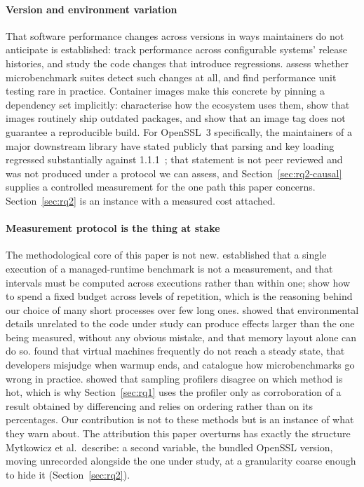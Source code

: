 \documentclass[preprint,12pt,authoryear]{elsarticle}
\begin{document}
\paragraph{Version and environment variation} That software performance
changes across versions in ways maintainers do not anticipate is established:
\citet{kaltenecker2023performance} track performance across
configurable systems' release histories, and \citet{chen2017exploratory} study the code changes that introduce
regressions. \citet{laaber2018evaluation} assess whether
microbenchmark suites detect such changes at all, and \citet{stefan2017unit} find performance unit testing rare in practice.
Container images make this concrete by pinning a dependency set implicitly:
\citet{cito2017empirical} characterise how the ecosystem uses them,
\citet{zerouali2019outdated} show that images routinely ship
outdated packages, and \citet{malka2026docker} show that an image
tag does not guarantee a reproducible build. For OpenSSL~3 specifically, the
maintainers of a major downstream library have stated publicly that parsing and
key loading regressed substantially against 1.1.1~\citep{pyca2026stateofopenssl};
that statement is not peer reviewed and was not produced under a protocol we
can assess, and Section~\ref{sec:rq2-causal} supplies a controlled measurement
for the one path this paper concerns. Section~\ref{sec:rq2} is an instance with
a measured cost attached.

\paragraph{Measurement protocol is the thing at stake} The methodological core
of this paper is not new. \citet{georges2007statistically}
established that a single execution of a managed-runtime benchmark is not a
measurement, and that intervals must be computed across executions rather than
within one; \citet{kalibera2013rigorous} show how to spend a
fixed budget across levels of repetition, which is the reasoning behind our
choice of many short processes over few long ones. \citet{mytkowicz2009wrong} showed that environmental details unrelated to
the code under study can produce effects larger than the one being measured,
without any obvious mistake, and \citet{curtsinger2013stabilizer} that memory layout alone can do so.
\citet{barrett2017warmup} found that virtual machines frequently
do not reach a steady state, \citet{traini2023steady} that
developers misjudge when warmup ends, and \citet{costa2021wrong}
catalogue how microbenchmarks go wrong in practice. \citet{mytkowicz2010profilers} showed that sampling profilers disagree on
which method is hot, which is why Section~\ref{sec:rq1} uses the profiler only
as corroboration of a result obtained by differencing and relies on ordering
rather than on its percentages. Our contribution is not to these methods but is
an instance of what they warn about. The attribution this paper overturns has
exactly the structure Mytkowicz et al.\ describe: a second variable, the
bundled OpenSSL version, moving unrecorded alongside the one under study, at
a granularity coarse enough to hide it (Section~\ref{sec:rq2}).
\end{document}
